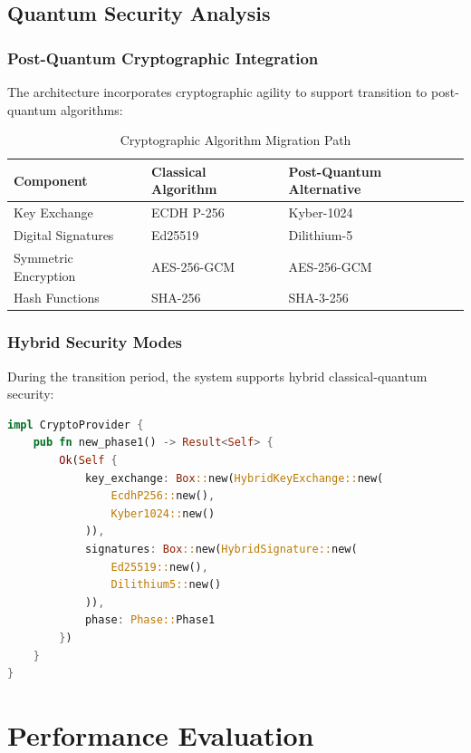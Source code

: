 \documentclass[11pt,a4paper]{article}
\theoremstyle{definition}
\theoremstyle{remark}
\begin{document}
\subsection{Quantum Security Analysis}

\subsubsection{Post-Quantum Cryptographic Integration}

The architecture incorporates cryptographic agility to support transition to post-quantum algorithms:

\begin{table}[h]
\centering
\begin{tabular}{@{}lll@{}}
\toprule
Component & Classical Algorithm & Post-Quantum Alternative \\
\midrule
Key Exchange & ECDH P-256 & Kyber-1024 \\
Digital Signatures & Ed25519 & Dilithium-5 \\
Symmetric Encryption & AES-256-GCM & AES-256-GCM \\
Hash Functions & SHA-256 & SHA-3-256 \\
\bottomrule
\end{tabular}
\caption{Cryptographic Algorithm Migration Path}
\end{table}

\subsubsection{Hybrid Security Modes}

During the transition period, the system supports hybrid classical-quantum security:

\begin{lstlisting}[language=Rust, caption=Hybrid Cryptographic Configuration]
impl CryptoProvider {
    pub fn new_phase1() -> Result<Self> {
        Ok(Self {
            key_exchange: Box::new(HybridKeyExchange::new(
                EcdhP256::new(),
                Kyber1024::new()
            )),
            signatures: Box::new(HybridSignature::new(
                Ed25519::new(),
                Dilithium5::new()
            )),
            phase: Phase::Phase1
        })
    }
}
\end{lstlisting}

\section{Performance Evaluation}
\end{document}
